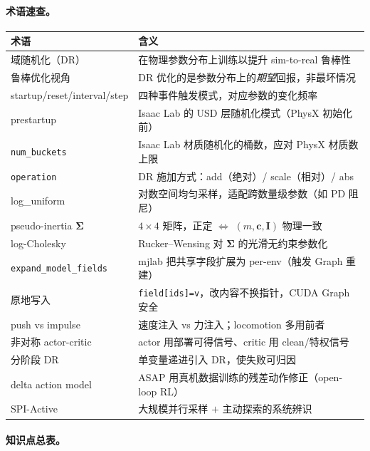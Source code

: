 \paragraph{术语速查。}

\begin{center}
\small
\begin{tabular}{@{}lp{8.6cm}@{}}
\toprule
术语 & 含义 \\
\midrule
域随机化（DR） & 在物理参数分布上训练以提升 sim-to-real 鲁棒性 \\
鲁棒优化视角 & DR 优化的是参数分布上的\emph{期望}回报，非最坏情况 \\
startup/reset/interval/step & 四种事件触发模式，对应参数的变化频率 \\
prestartup & Isaac Lab 的 USD 层随机化模式（PhysX 初始化前） \\
\verb|num_buckets| & Isaac Lab 材质随机化的桶数，应对 PhysX 材质数上限 \\
\verb|operation| & DR 施加方式：add（绝对）/ scale（相对）/ abs \\
log\_uniform & 对数空间均匀采样，适配跨数量级参数（如 PD 阻尼） \\
pseudo-inertia $\boldsymbol\Sigma$ & $4\times4$ 矩阵，正定 $\Leftrightarrow$ $(m,\mathbf c,\mathbf I)$ 物理一致 \\
log-Cholesky & Rucker--Wensing 对 $\boldsymbol\Sigma$ 的光滑无约束参数化 \\
\verb|expand_model_fields| & mjlab 把共享字段扩展为 per-env（触发 Graph 重建） \\
原地写入 & \verb|field[ids]=v|，改内容不换指针，CUDA Graph 安全 \\
push vs impulse & 速度注入 vs 力注入；locomotion 多用前者 \\
非对称 actor-critic & actor 用部署可得信号、critic 用 clean/特权信号 \\
分阶段 DR & 单变量递进引入 DR，使失败可归因 \\
delta action model & ASAP 用真机数据训练的残差动作修正（open-loop RL） \\
SPI-Active & 大规模并行采样 $+$ 主动探索的系统辨识 \\
\bottomrule
\end{tabular}
\end{center}

\paragraph{知识点总表。}

